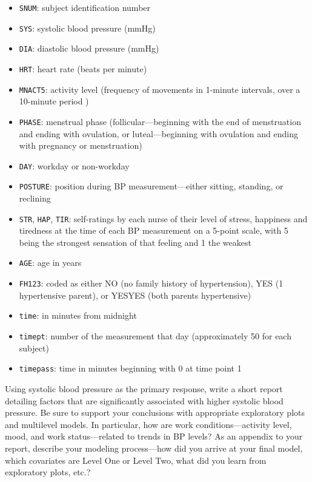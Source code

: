 \documentclass[
]{krantz}
\providecommand{\tightlist}{%
  \setlength{\itemsep}{0pt}\setlength{\parskip}{0pt}}
\begin{document}
\begin{enumerate}
  \begin{itemize}
  \tightlist
  \item
    \texttt{SNUM}: subject identification number
  \item
    \texttt{SYS}: systolic blood pressure (mmHg)
  \item
    \texttt{DIA}: diastolic blood pressure (mmHg)
  \item
    \texttt{HRT}: heart rate (beats per minute)
  \item
    \texttt{MNACT5}: activity level (frequency of movements in 1-minute intervals, over a 10-minute period )
  \item
    \texttt{PHASE}: menstrual phase (follicular---beginning with the end of menstruation and ending with ovulation, or luteal---beginning with ovulation and ending with pregnancy or menstruation)
  \item
    \texttt{DAY}: workday or non-workday
  \item
    \texttt{POSTURE}: position during BP measurement---either sitting, standing, or reclining
  \item
    \texttt{STR}, \texttt{HAP}, \texttt{TIR}: self-ratings by each nurse of their level of stress, happiness and tiredness at the time of each BP measurement on a 5-point scale, with 5 being the strongest sensation of that feeling and 1 the weakest
  \item
    \texttt{AGE}: age in years
  \item
    \texttt{FH123}: coded as either NO (no family history of hypertension), YES (1 hypertensive parent), or YESYES (both parents hypertensive)
  \item
    \texttt{time}: in minutes from midnight
  \item
    \texttt{timept}: number of the measurement that day (approximately 50 for each subject)
  \item
    \texttt{timepass}: time in minutes beginning with 0 at time point 1
  \end{itemize}

  Using systolic blood pressure as the primary response, write a short report detailing factors that are significantly associated with higher systolic blood pressure. Be sure to support your conclusions with appropriate exploratory plots and multilevel models. In particular, how are work conditions---activity level, mood, and work status---related to trends in BP levels? As an appendix to your report, describe your modeling process---how did you arrive at your final model, which covariates are Level One or Level Two, what did you learn from exploratory plots, etc.?


\end{enumerate}
\end{document}
